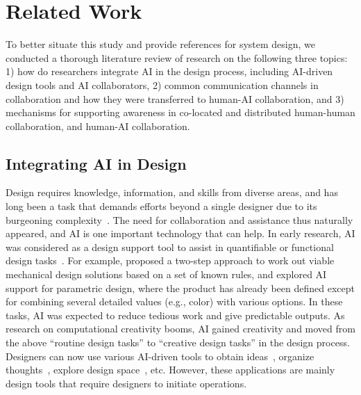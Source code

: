 \section{Related Work}
To better situate this study and provide references for system design, we conducted a thorough literature review of research on the following three topics: 1) how do researchers integrate AI in the design process, including AI-driven design tools and AI collaborators, 2) common communication channels in collaboration and how they were transferred to human-AI collaboration, and 3) mechanisms for supporting awareness in co-located and distributed human-human collaboration, and human-AI collaboration.

\subsection{Integrating AI in Design}
Design requires knowledge, information, and skills from diverse areas, and has long been a task that demands efforts beyond a single designer due to its burgeoning complexity~\cite{Rodgers1998role, Tang1996AI, Zhou2024Understanding}. The need for collaboration and assistance thus naturally appeared, and AI is one important technology that can help. In early research, AI was considered as a design support tool to assist in quantifiable or functional design tasks~\cite{Rodgers1998role}. For example, \citet{Chakrabarti1994Two} proposed a two-step approach to work out viable mechanical design solutions based on a set of known rules, and \citet{Grecu1996Learning} explored AI support for parametric design, where the product has already been defined except for combining several detailed values (e.g., color) with various options. In these tasks, AI was expected to reduce tedious work and give predictable outputs. As research on computational creativity booms, AI gained creativity and moved from the above ``routine design tasks'' to ``creative design tasks'' in the design process. Designers can now use various AI-driven tools to obtain ideas~\cite{Liu20233DALL, Koch2019May}, organize thoughts~\cite{Zhong2024Causal}, explore design space~\cite{Camburn2020Computer, Wang2024RoomDreaming}, etc. However, these applications are mainly design tools that require designers to initiate operations.


